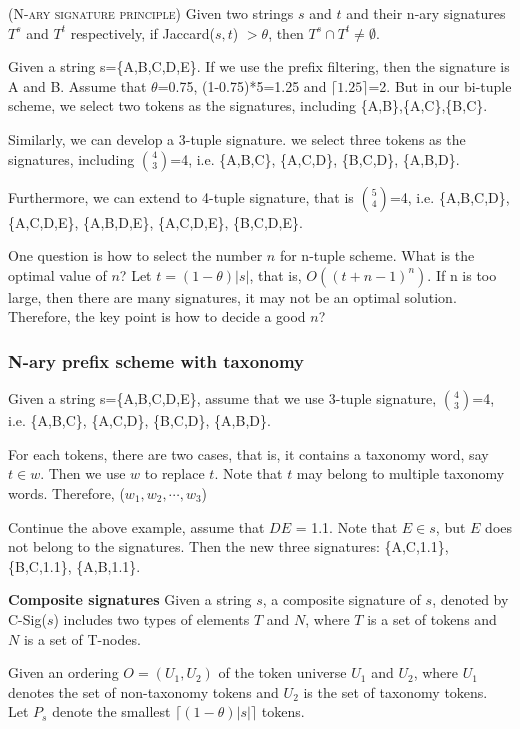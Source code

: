 \begin{lem} (\textsc{N-ary signature principle}) Given two strings $s$ and $t$ and their n-ary signatures $T^s$ and $T^t$ respectively, if Jaccard($s, t$) $> \theta$, then $T^s \cap T^t \neq \emptyset$.
\end{lem}

Given a string s=\{A,B,C,D,E\}. If we use the prefix filtering, then the signature is A and B. Assume that $\theta$=0.75, (1-0.75)*5=1.25 and $\lceil 1.25 \rceil$=2. But in our bi-tuple scheme, we select two tokens as the signatures, including \{A,B\},\{A,C\},\{B,C\}.

Similarly, we can develop a 3-tuple signature. we select three tokens as the signatures, including $\binom{4}{3}$=4, i.e. \{A,B,C\}, \{A,C,D\}, \{B,C,D\}, \{A,B,D\}.

Furthermore, we can extend to 4-tuple signature, that is $\binom{5}{4}$=4, i.e. \{A,B,C,D\}, \{A,C,D,E\}, \{A,B,D,E\}, \{A,C,D,E\}, \{B,C,D,E\}.

One question is how to select the number $n$ for n-tuple scheme. What is the optimal value of $n$? Let $t= (1-\theta)|s|$, that is, $O((t+n-1)^{n})$. If n is too large, then there are many signatures, it may not be an optimal solution. Therefore, the key point is how to decide a good $n$?


\subsubsection{N-ary prefix scheme with taxonomy}

 Given a string s=\{A,B,C,D,E\}, assume that we use 3-tuple signature, $\binom{4}{3}$=4, i.e. \{A,B,C\}, \{A,C,D\}, \{B,C,D\}, \{A,B,D\}.

For each tokens, there are two cases, that is, it contains a taxonomy word, say $t \in w$. Then we use $w$ to replace $t$. Note that $t$ may belong to multiple taxonomy words. Therefore, ($w_1, w_2, \cdots, w_3$)

Continue the above example, assume that $DE$ = 1.1. Note that $E \in s $, but $E$ does not belong to the signatures. Then the new three signatures:  \{A,C,1.1\}, \{B,C,1.1\}, \{A,B,1.1\}.

\noindent \textbf{Composite signatures} Given a string $s$, a composite signature of $s$, denoted by C-Sig($s$) includes two types of elements $T$ and $N$, where $T$ is a set of tokens and $N$ is a set of T-nodes.

Given an
ordering $O = (U_1 , U_2 )$ of the token universe $U_1$ and $U_2$, where $U_1$ denotes the set of non-taxonomy tokens and $U_2$ is the set of taxonomy tokens. Let $P_s$ denote the smallest $\lceil(1-\theta)|s|\rceil$ tokens.

